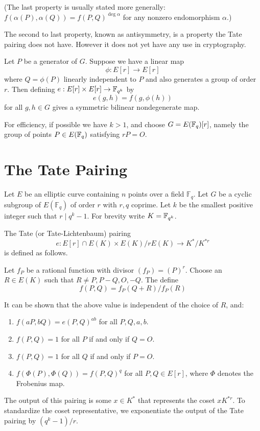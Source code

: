 (The last property is usually stated more generally:
$f(\alpha(P),\alpha(Q)) = f(P,Q)^{\deg \alpha}$ for any nonzero
endomorphism $\alpha$.)

The second to last property, known as antisymmetry, is a property the
Tate pairing does not have. However it does not yet have
any use in cryptography.

Let $P$ be a generator of $G$. Suppose
we have a linear map
\[ \phi : E[r] \rightarrow E[r] \]
where $Q = \phi(P)$ linearly independent to $P$ and also generates
a group of order $r$.
Then defining $e:E[r]\times E[r]\rightarrow \mathbb{F}_{q^k}$ by
\[ e(g,h) = f(g,\phi(h)) \]
for all $g, h \in G$
gives a symmetric bilinear nondegenerate map.

For efficiency, if possible we have $k > 1$, and choose
$G = E(\mathbb{F}_q)[r]$, namely the
group of points $P \in E(\mathbb{F}_q)$ satisfying $r P = O$.

\section {The Tate Pairing }

Let $E$ be an elliptic curve containing $n$ points over a field $\mathbb{F}_q$.
Let $G$ be a cyclic subgroup of $E(\mathbb{F}_q)$ of order $r$ with $r, q$
coprime. Let $k$ be the smallest positive integer such that $r \mid q^k - 1$.
For brevity write $K = \mathbb{F}_{q^k}$.

The Tate (or Tate-Lichtenbaum) pairing
\[
e : E[r] \cap E(K) \times
E(K) / r E(K) \rightarrow
K^* / K^{*r}
\]
is defined as follows.

Let $f_P$ be a rational function with divisor $(f_P) = (P)^r$.
Choose an $R\in E(K)$ such that $R \ne P, P-Q, O, -Q$. The define
\[
f(P, Q) = f_P (Q + R) / f_P (R)
\]

It can be shown that the above value is independent of the choice of $R$,
and:
\begin{enumerate}
\item
$f(a P, b Q) = e(P, Q)^{a b}$ for all $P, Q, a, b$.
\item
$f(P,Q) = 1$ for all $P$ if and only if $Q = O$.
\item
$f(P,Q) = 1$ for all $Q$ if and only if $P = O$.
\item
$f(\Phi(P),\Phi(Q)) = f(P,Q)^{q}$ for all $P,Q \in E[r]$,
where $\Phi$ denotes the Frobenius map.
\end{enumerate}

The output of this pairing is some $x \in K^*$
that represents the coset $x K^{*r}$. To standardize the coset
representative, we exponentiate the output of the Tate pairing
by $(q^k - 1) / r$.

